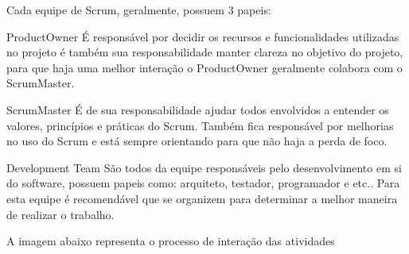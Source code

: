 	\begin{figure}[h!]
		\centering
	\end{figure}

Cada equipe de Scrum, geralmente, possuem 3 papeis:
\begin{alineascomponto}
	\item ProductOwner
É responsável por decidir os recursos e funcionalidades utilizadas no projeto é também sua responsabilidade manter clareza no objetivo do projeto, para que haja uma melhor interação o ProductOwner geralmente colabora com o ScrumMaster.

	\item ScrumMaster
É de sua responsabilidade ajudar todos envolvidos a entender os valores, princípios e práticas do Scrum. Também fica responsável por melhorias no uso do Scrum e está sempre orientando para que não haja a perda de foco. 

	\item Development Team
São todos da equipe responsáveis pelo desenvolvimento em si do software, possuem papeis como: arquiteto, testador, programador e etc.. Para esta equipe é recomendável que se organizem para determinar a melhor maneira de realizar o trabalho.

	\end{alineascomponto}
	
	
	A imagem abaixo representa o processo de interação das atividades

